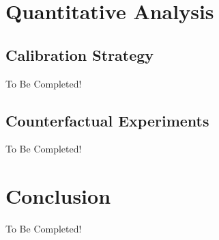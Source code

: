 \documentclass[onehalfspacing,11pt]{article}
\begin{document}
\section{Quantitative Analysis}\label{sec:quant}
\subsection{Calibration Strategy}
{\sc To Be Completed!}
\subsection{Counterfactual Experiments}
{\sc To Be Completed!}
\section{Conclusion}\label{sec:conclusion}
{\sc To Be Completed!}
\newpage


\end{document}
